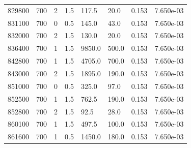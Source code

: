 \documentclass[preview]{standalone}
\begin{document}
{{{{{\begin{tabular}{L{1.2cm}C{1.2cm} C{0.3cm}C{0.5cm} C{1.4cm}C{1.4cm} C{1.4cm}C{1.4cm}}
  829800  &   700  & 2     & 1.5 &  117.5  & 20.0  & 0.153 &  7.650e-03   \\ 
  831100  &   700  & 0     & 0.5 &  145.0  & 43.0  & 0.153 &  7.650e-03   \\ 
  832000  &   700  & 2     & 1.5 &  130.0  & 20.0  & 0.153 &  7.650e-03   \\ 
  836400  &   700  & 1     & 1.5 &  9850.0  & 500.0  & 0.153 &  7.650e-03   \\ 
  842800  &   700  & 1     & 1.5 &  4705.0  & 700.0  & 0.153 &  7.650e-03   \\ 
  843000  &   700  & 2     & 1.5 &  1895.0  & 190.0  & 0.153 &  7.650e-03   \\ 
  851000  &   700  & 0     & 0.5 &  325.0  & 97.0  & 0.153 &  7.650e-03   \\ 
  852500  &   700  & 1     & 1.5 &  762.5  & 190.0  & 0.153 &  7.650e-03   \\ 
  852800  &   700  & 2     & 1.5 &  92.5  & 28.0  & 0.153 &  7.650e-03   \\ 
  860100  &   700  & 1     & 1.5 &  497.5  & 100.0  & 0.153 &  7.650e-03   \\ 
  861600  &   700  & 1     & 0.5 &  1450.0  & 180.0  & 0.153 &  7.650e-03   \\ 
\hline 
\end{tabular} 

}}}}}
\end{document}
